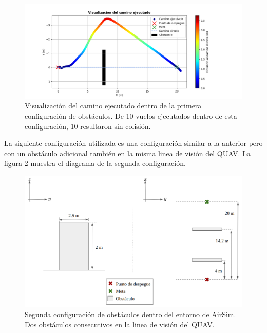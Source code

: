 \begin{figure}[H]
    \centering
    \includegraphics[scale=0.55]{partes/ImgJoao/sim-simgle-panel-graph.png}
    \caption[Visualización del camino ejecutado dentro de la primera configuración de obstáculos.]{Visualización del camino ejecutado dentro de la primera configuración de obstáculos. De 10 vuelos ejecutados dentro de esta configuración, 10 resultaron sin colisión.}
    \label{fig:single-graph}
\end{figure}

La siguiente configuración utilizada es una configuración similar a la anterior pero con un obstáculo adicional también en la misma linea de visión del QUAV. La figura \ref{fig:config-2-double} muestra el diagrama de la segunda configuración.

\begin{figure}[H]
    \centering
    \includegraphics[scale=0.35]{partes/ImgJoao/config-2-double.png}
    \caption[Segunda configuración de obstáculos dentro del entorno de AirSim.]{Segunda configuración de obstáculos dentro del entorno de AirSim. Dos obstáculos consecutivos en la linea de visión del QUAV.}
    \label{fig:config-2-double}
\end{figure}


